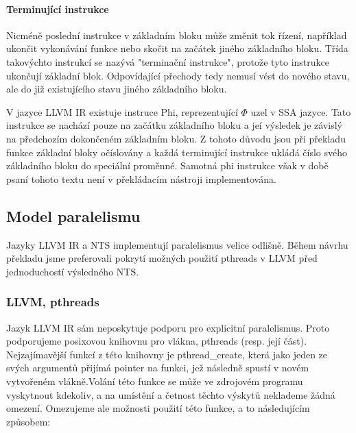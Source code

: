 \documentclass[10pt,a4paper,notitlepage]{report}
\begin{document}
\paragraph{Terminující instrukce}
Nicméně poslední instrukce v základním bloku může změnit tok řízení, například ukončit vykonávání funkce nebo skočit na začátek jiného základního bloku. Třída takovýchto instrukcí se nazývá "terminační instrukce", protože tyto instrukce ukončují základní blok. Odpovídající přechody tedy nemusí vést do nového stavu, ale do již existujícího stavu jiného základního bloku.

V jazyce LLVM IR existuje instruce Phi, reprezentující $\Phi$ uzel  v SSA jazyce. Tato instrukce se nachází pouze na začátku základního bloku a jeí výsledek je závislý na předchozím dokončeném základním bloku. Z tohoto důvodu jsou při překladu funkce základní bloky očíslovány a každá terminující instrukce ukládá číslo svého základního bloku do speciální proměnné. Samotná phi instrukce však v době psaní tohoto textu není v překládacím nástroji implementována.




\subsection{Model paralelismu}
\label{subsec:paralelism}

Jazyky LLVM IR a NTS implementují paralelismus velice odlišně. Během návrhu překladu jsme preferovali pokrytí možných použití pthreads v LLVM před jednoduchostí výsledného NTS.

\subsubsection{LLVM, pthreads}Jazyk LLVM IR sám neposkytuje podporu pro explicitní paralelismus. Proto podporujeme posixovou knihovnu pro vlákna, pthreads (resp. její část). Nejzajímavější funkcí z této knihovny je pthread\_create, která jako jeden ze svých argumentů přijímá pointer na funkci, jež následně spustí v novém vytvořeném vlákně.Volání této funkce se může ve zdrojovém programu vyskytnout kdekoliv, a na umístění a četnost těchto výskytů neklademe žádná omezení. Omezujeme ale možnosti použití této funkce, a to následujícím způsobem:
\end{document}
